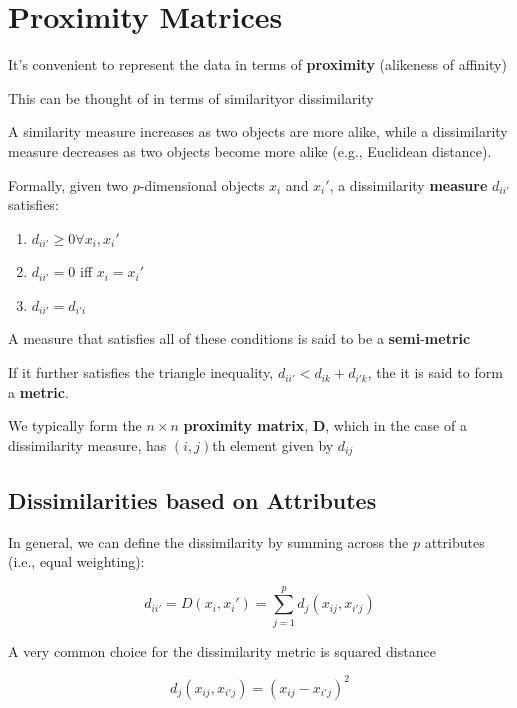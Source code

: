 \documentclass[
]{book}
\providecommand{\tightlist}{%
  \setlength{\itemsep}{0pt}\setlength{\parskip}{0pt}}
\begin{document}
\hypertarget{proximity-matrices}{%
\section{Proximity Matrices}\label{proximity-matrices}}

It's convenient to represent the data in terms of \textbf{proximity} (alikeness of affinity)

This can be thought of in terms of similarityor dissimilarity

A similarity measure increases as two objects are more alike, while a dissimilarity measure decreases as two objects become more alike (e.g., Euclidean distance).

Formally, given two \(p\)-dimensional objects \(x_i\) and \(x_i'\), a dissimilarity \textbf{measure} \(d_{ii'}\) satisfies:

\begin{enumerate}
\def\labelenumi{\arabic{enumi}.}
\tightlist
\item
  \(d_{ii'} \ge 0 \forall x_i, x_i'\)
\item
  \(d_{ii'} = 0\) iff \(x_i = x_i'\)
\item
  \(d_{ii'} = d_{i'i}\)
\end{enumerate}

A measure that satisfies all of these conditions is said to be a \textbf{semi}-\textbf{metric}

If it further satisfies the triangle inequality, \(d_{ii'} < d_{ik} + d_{i'k}\), the it is said to form a \textbf{metric}.

We typically form the \(n \times n\) \textbf{proximity matrix}, \(\mathbf{D}\), which in the case of a dissimilarity measure, has \((i,j)\)th element given by \(d_{ij}\)

\hypertarget{dissimilarities-based-on-attributes}{%
\subsection{Dissimilarities based on Attributes}\label{dissimilarities-based-on-attributes}}

In general, we can define the dissimilarity by summing across the \(p\) attributes (i.e., equal weighting):

\[
d_{ii'} = D(x_i, x_i') = \sum_{j=1}^p d_j (x_{ij}, x_{i'j})
\]

A very common choice for the dissimilarity metric is squared distance

\[
d_j(x_{ij}, x_{i'j}) = (x_{ij} - x_{i'j})^2
\]
\end{document}
